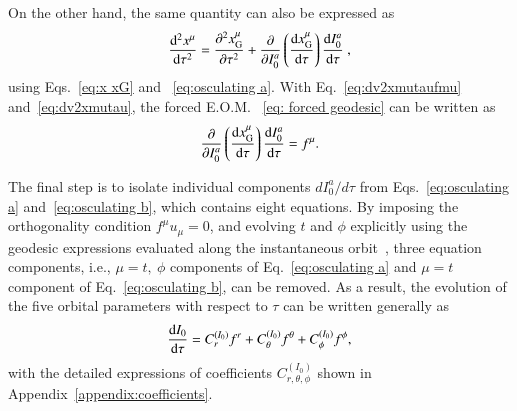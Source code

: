 \documentclass[aps,prx,reprint,superscriptaddress,nofootinbib,longbibliography]{revtex4-1}
\begin{document}
On the other hand, the same quantity can also be expressed as
\begin{equation}
    \dv[2]{x^{\mu}}{\tau}=\pdv[2]{x_{\rm G}^{\mu}}{\tau}+\pdv{I_{0}^a}\left(\dv{x^{\mu}_{\rm G}}{\tau}\right)\dv{I_{0}^a}{\tau}\ ,
    \label{eq:dv2xmutau}
\end{equation}
using Eqs.~\eqref{eq:x xG} and ~\eqref{eq:osculating a}. 
With Eq.~\eqref{eq:dv2xmutaufmu} and~\eqref{eq:dv2xmutau},  the forced E.O.M. ~\eqref{eq: forced geodesic} can be written as
\begin{equation}
    \pdv{I_{0}^a}\left(\dv{x^{\mu}_{\rm G}}{\tau}\right)\dv{I_{0}^a}{\tau}=f^{\mu}.
    \label{eq:osculating b}
\end{equation}

The final step is to isolate individual components $d I_0^a/d\tau$ from Eqs.~\eqref{eq:osculating a} and~\eqref{eq:osculating b}, which contains 
eight equations. By imposing the orthogonality condition $f^{\mu}u_{\mu}=0$, and evolving $t$ and $\phi$ explicitly using the geodesic expressions evaluated along the instantaneous orbit~\cite{PhysRevD.83.044037}, three equation components, i.e., $\mu=t,\ \phi$ components of Eq.~\eqref{eq:osculating a} and $\mu=t$ component of Eq.~\eqref{eq:osculating b}, can be removed. %
As a result, the evolution of the five orbital parameters with respect to $\tau$ can be written generally as
\begin{equation}
    \dv{I_{0}}{\tau}=C^{(I_{0})}_rf^{r}+C^{(I_{0})}_{\theta}f^{\theta}+C^{(I_{0})}_{\phi}f^{\phi},
    \label{eq:parameter evolution ode}
\end{equation}
with the detailed expressions of coefficients $C^{(I_{0})}_{r,\theta,\phi}$ shown in Appendix~\ref{appendix:coefficients}.
\end{document}
